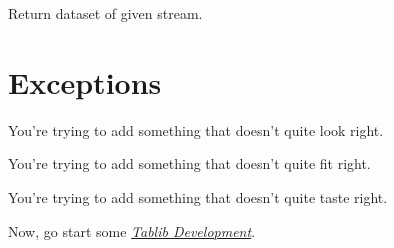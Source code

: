 \documentclass[a4paper,12pt,english]{sphinxmanual}
\begin{document}
\begin{fulllineitems}
\label{api:tablib.import_set}
Return dataset of given stream.

\end{fulllineitems}



\section{Exceptions}
\label{api:exceptions}

\begin{fulllineitems}
\label{api:tablib.InvalidDatasetType}
You're trying to add something that doesn't quite look right.

\end{fulllineitems}


\begin{fulllineitems}
\label{api:tablib.InvalidDimensions}
You're trying to add something that doesn't quite fit right.

\end{fulllineitems}


\begin{fulllineitems}
\label{api:tablib.UnsupportedFormat}
You're trying to add something that doesn't quite taste right.

\end{fulllineitems}


Now, go start some {\hyperref[development:development]{\emph{Tablib Development}}}.



\renewcommand{\indexname}{Index}
\printindex
\end{document}
